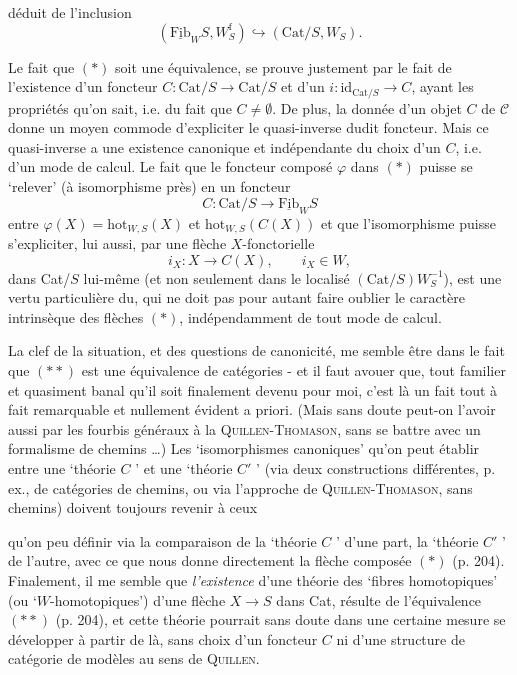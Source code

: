 \documentclass[11pt]{article}
\newcommand{\printedpage}[1]{\marginpar{\footnotesize p.~#1}}
\newcommand{\msp}[1]{\marginpar{\footnotesize [#1]}}
\newcommand{\Fib}{\underline{\mathrm{Fib}}}
\newcommand{\Cat}{\mathrm{Cat}}
\newcommand{\hot}{\mathrm{hot}}
\newcommand{\id}{\mathrm{id}}
\begin{document}
\msp{page 205}déduit de l'inclusion
\[
(\Fib_W S, W^{\mathrm{f}}_S) \hookrightarrow (\Cat/S, W_S).
\]

Le fait que $(*)$ soit une équivalence, se prouve justement par le fait de l'existence d'un foncteur $C : \Cat/S \longrightarrow \Cat/S$ et d'un $i : \id_{\Cat/S} \longrightarrow C$, ayant les propriétés qu'on sait, i.e. du fait que $C \neq \emptyset$. De plus, la donnée d'un objet $C$ de $\mathcal{C}$ donne un moyen commode d'expliciter le quasi-inverse dudit foncteur. Mais ce quasi-inverse a une existence canonique et indépendante du choix d'un $C$, i.e. d'un mode de calcul. Le fait que le foncteur composé $\varphi$ dans $(*)$ puisse se ‘relever’ (à isomorphisme près) en un foncteur %
\[
C : \Cat/S \longrightarrow \Fib_W S
\]
entre $\varphi(X) = \hot_{W,S}(X)$ et $\hot_{W,S}(C(X))$ et que l'isomorphisme puisse s'expliciter, lui aussi, par une flèche $X$-fonctorielle
\[
i_X : X \longrightarrow C(X), \qquad i_X \in W,
\]
dans Cat/$S$ lui-même (et non seulement dans le localisé $(\Cat/S)W_S^{-1}$),
\printedpage{134}
\msp{page 206}est une vertu particulière du, qui ne doit pas pour autant faire oublier le caractère intrinsèque des flèches $(*)$, indépendamment de tout mode de calcul.

{\reversemarginpar\marginnote{$\|$}}%
La clef de la situation, et des questions de canonicité, me semble être dans le fait que $(**)$ est une équivalence de catégories - et il faut avouer que, tout familier et quasiment banal qu'il soit finalement devenu pour moi, c'est là un fait tout à fait remarquable et nullement évident a priori. (Mais sans doute peut-on l'avoir aussi par les fourbis généraux à la \textsc{Quillen-Thomason}, sans se battre avec un formalisme de chemins \dots) Les ‘isomorphismes canoniques’ qu'on peut établir entre une ‘théorie $C$ ’ et une ‘théorie $C'$ ’ (via deux constructions différentes, p. ex., de catégories de chemins, ou via l'approche de \textsc{Quillen-Thomason}, sans chemins) doivent toujours revenir à ceux

\msp{page 207}qu'on peu définir via la comparaison de la ‘théorie $C$ ’ d'une part, la ‘théorie $C'$ ’ de l'autre, avec ce que nous donne directement la flèche composée $(*)$ (p. 204). Finalement, il me semble que \textit{l'existence} d'une théorie des ‘fibres homotopiques’ (ou ‘$W$-homotopiques’) d'une flèche $X \longrightarrow S$ dans Cat, résulte de l'équivalence $(**)$ (p. 204), et cette théorie pourrait sans doute dans une certaine mesure se développer à partir de là, sans choix d'un foncteur $C$ ni d'une structure de catégorie de modèles au sens de \textsc{Quillen}. %
\end{document}
